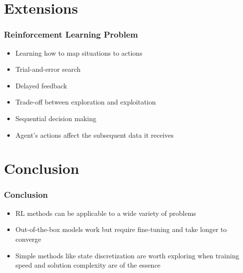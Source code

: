 \documentclass{beamer}
\begin{document}


    \section{Extensions}

    \begin{frame}
        \frametitle{Reinforcement Learning Problem}
        \begin{itemize}
            \item Learning how to map situations to actions
            \item Trial-and-error search
            \item Delayed feedback
            \item Trade-off between exploration and exploitation
            \item Sequential decision making
            \item Agent's actions affect the subsequent data it receives
        \end{itemize}
    \end{frame}




    \section{Conclusion}

    \begin{frame}
        \frametitle{Conclusion}
        \begin{itemize}
            \item RL methods can be applicable to
            a wide variety of problems

            \item Out-of-the-box models work but
            require fine-tuning and take
            longer to converge

            \item Simple methods like state discretization
            are worth exploring when training speed and
            solution complexity are of the essence

        \end{itemize}
    \end{frame}
\end{document}
